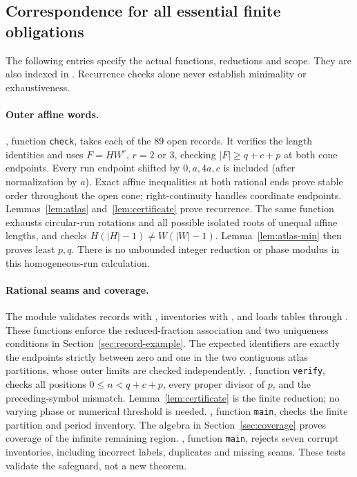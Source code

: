 \documentclass[11pt]{article}
\theoremstyle{remark}\newtheorem{remark}[theorem]{Remark}
\begin{document}
\subsection{Correspondence for all essential finite obligations}
The following entries specify the actual functions, reductions and scope.
They are also indexed in . Recurrence checks alone
never establish minimality or exhaustiveness.

\paragraph{Outer affine words.}
, function \texttt{check}, takes each of the
89 open records. It verifies the length identities and uses
$F=HW^r$, $r=2$ or $3$, checking $|F|\ge q+c+p$ at both cone endpoints.
Every run endpoint shifted by $0,a,4a,c$ is included (after normalization
by $a$). Exact affine inequalities at both rational ends prove stable order
throughout the open cone; right-continuity handles coordinate endpoints.
Lemmas~\ref{lem:atlas} and~\ref{lem:certificate} prove recurrence.
The same function exhausts circular-run rotations and all possible isolated
roots of unequal affine lengths, and checks $H(|H|-1)\ne W(|W|-1)$.
Lemma~\ref{lem:atlas-min} then proves least $p,q$. There is no unbounded
integer reduction or phase modulus in this homogeneous-run calculation.

\paragraph{Rational seams and coverage.}
The module  validates records with
, inventories with , and
loads tables through . These functions enforce the
reduced-fraction association and two uniqueness conditions in
Section~\ref{sec:record-example}. The expected identifiers are exactly
the endpoints strictly between zero and one in the two contiguous atlas
partitions, whose outer limits are checked independently.
, function \texttt{verify}, checks all positions
$0\le n<q+c+p$, every proper divisor of $p$, and the preceding-symbol
mismatch. Lemma~\ref{lem:certificate} is the finite reduction; no varying
phase or numerical threshold is needed. ,
function \texttt{main}, checks the finite partition and period inventory.
The algebra in Section~\ref{sec:coverage} proves coverage of the infinite
remaining region. , function \texttt{main},
rejects seven corrupt inventories, including incorrect labels, duplicates
and missing seams. These tests validate the safeguard, not a new theorem.
\end{document}
